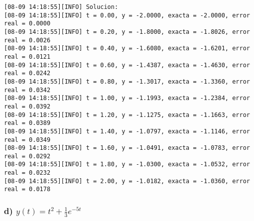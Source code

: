 \documentclass[
  letterpaper,
  DIV=11,
  numbers=noendperiod]{scrartcl}
\begin{document}
\begin{verbatim}
[08-09 14:18:55][INFO] Solucion:
[08-09 14:18:55][INFO] t = 0.00, y = -2.0000, exacta = -2.0000, error real = 0.0000
[08-09 14:18:55][INFO] t = 0.20, y = -1.8000, exacta = -1.8026, error real = 0.0026
[08-09 14:18:55][INFO] t = 0.40, y = -1.6080, exacta = -1.6201, error real = 0.0121
[08-09 14:18:55][INFO] t = 0.60, y = -1.4387, exacta = -1.4630, error real = 0.0242
[08-09 14:18:55][INFO] t = 0.80, y = -1.3017, exacta = -1.3360, error real = 0.0342
[08-09 14:18:55][INFO] t = 1.00, y = -1.1993, exacta = -1.2384, error real = 0.0392
[08-09 14:18:55][INFO] t = 1.20, y = -1.1275, exacta = -1.1663, error real = 0.0389
[08-09 14:18:55][INFO] t = 1.40, y = -1.0797, exacta = -1.1146, error real = 0.0349
[08-09 14:18:55][INFO] t = 1.60, y = -1.0491, exacta = -1.0783, error real = 0.0292
[08-09 14:18:55][INFO] t = 1.80, y = -1.0300, exacta = -1.0532, error real = 0.0232
[08-09 14:18:55][INFO] t = 2.00, y = -1.0182, exacta = -1.0360, error real = 0.0178
\end{verbatim}

\subsubsection{\texorpdfstring{d)
\(y(t)=t^2+\frac{1}{3}e^{-5t}\)}{d) y(t)=t\^{}2+\textbackslash frac\{1\}\{3\}e\^{}\{-5t\}}}\label{d-ytt2frac13e-5t}
\end{document}

